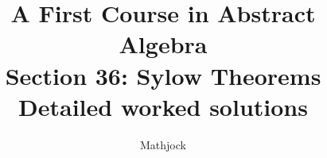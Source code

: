 
\title{\textbf{A First Course in Abstract Algebra}\\[0.3em]Section 36: Sylow Theorems\\[0.3em]\large Detailed worked solutions}
\author{Mathjock}
\date{}

\maketitle
\bookinfo
\tableofcontents
\clearpage
\renewcommand{\thesection}{36}
\renewcommand{\theHsection}{fraleigh.36}


